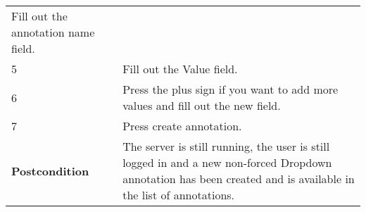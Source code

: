 \begin{longtable}[c]{@{}ll@{}}
\begin{minipage}[t]{0.63\columnwidth}\raggedright\strut
Fill out the annotation name field.
\strut\end{minipage}\tabularnewline
\begin{minipage}[t]{0.31\columnwidth}\raggedright\strut
5
\strut\end{minipage} &
\begin{minipage}[t]{0.63\columnwidth}\raggedright\strut
Fill out the Value field.
\strut\end{minipage}\tabularnewline
\begin{minipage}[t]{0.31\columnwidth}\raggedright\strut
6
\strut\end{minipage} &
\begin{minipage}[t]{0.63\columnwidth}\raggedright\strut
Press the plus sign if you want to add more values and fill out the new
field.
\strut\end{minipage}\tabularnewline
\begin{minipage}[t]{0.31\columnwidth}\raggedright\strut
7
\strut\end{minipage} &
\begin{minipage}[t]{0.63\columnwidth}\raggedright\strut
Press create annotation.
\strut\end{minipage}\tabularnewline
\begin{minipage}[t]{0.31\columnwidth}\raggedright\strut
\textbf{Postcondition}
\strut\end{minipage} &
\begin{minipage}[t]{0.63\columnwidth}\raggedright\strut
The server is still running, the user is still logged in and a new
non-forced Dropdown annotation has been created and is available in the
list of annotations.
\strut\end{minipage}\tabularnewline
\bottomrule
\end{longtable}

